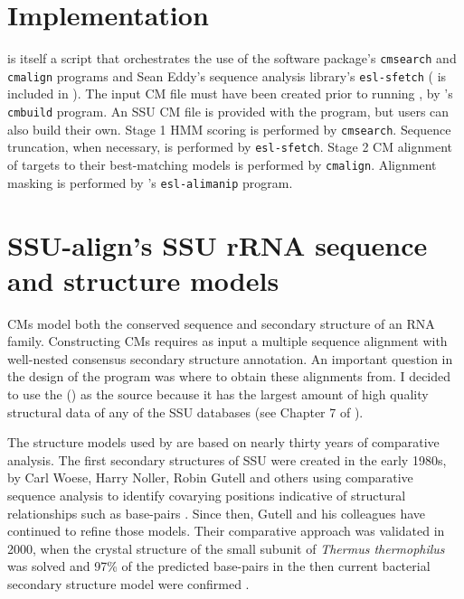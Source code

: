 \section{Implementation}

 is itself a  script that orchestrates the
use of the  software package's \texttt{cmsearch} and
\texttt{cmalign} programs \cite{infernal} and Sean Eddy's 
sequence analysis library's \texttt{esl-sfetch} ( is
included in ).  The input CM file must have been created
prior to running , by 's \texttt{cmbuild}
program. An SSU CM file is provided with the program, but users can
also build their own. Stage 1 HMM scoring is performed by
\texttt{cmsearch}. Sequence truncation, when necessary, is performed
by \texttt{esl-sfetch}. Stage 2 CM alignment of targets to their
best-matching models is performed by \texttt{cmalign}. Alignment
masking is performed by 's \texttt{esl-alimanip} program. 

\section{SSU-align's SSU rRNA sequence and structure models}

CMs model both the conserved sequence and secondary structure of an
RNA family. Constructing CMs requires as input a multiple sequence
alignment with well-nested consensus secondary structure
annotation. An important question in the design of the 
program was where to obtain these alignments from. I decided to use
the  () \cite{CannoneGutell02} as
the source because it has the largest amount of high quality
structural data of any of the SSU databases (see
Chapter 7 of \cite{Nawrocki09b}).

The structure models used by  are based on nearly thirty years of
comparative analysis. The first secondary structures of SSU were
created in the early 1980s, by Carl Woese, Harry Noller, Robin Gutell
and others using comparative sequence analysis to identify covarying
positions indicative of structural relationships such as base-pairs
\cite{Woese80,Noller81,Woese83}. Since then, Gutell and his
colleagues have continued to refine those models. Their comparative
approach was validated in 2000, when the crystal structure of the
small subunit of \emph{Thermus thermophilus} was solved
\cite{Wimberly00} and 97\% of the predicted base-pairs in the then
current bacterial secondary structure model were confirmed
\cite{Gutell02}.

